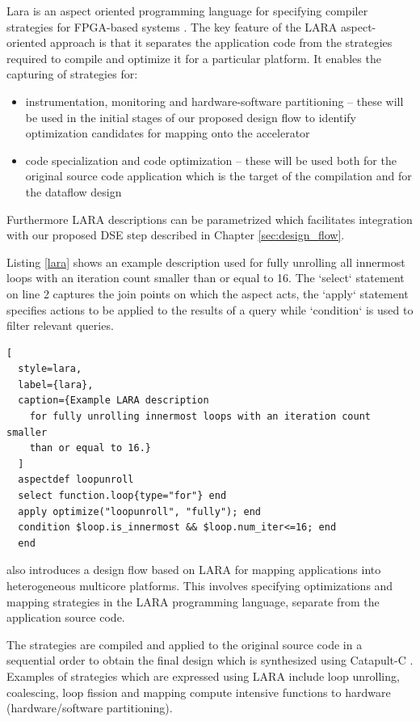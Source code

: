 Lara is an aspect oriented programming language for specifying
compiler strategies for FPGA-based systems
\cite{Cardoso:Teixeira:Alves:Nobre:Diniz:Cutinho:Luk:2012}. The key
feature of the LARA aspect-oriented approach is that it separates the
application code from the strategies required to compile and optimize
it for a particular platform. It enables the capturing of strategies
for:

\begin{itemize}
\item instrumentation, monitoring and hardware-software partitioning --
  these will be used in the initial stages of our proposed design flow
  to identify optimization candidates for mapping onto the accelerator

\item code specialization and code optimization -- these will be
  used both for the original source code application which is the
  target of the compilation and for the dataflow design
\end{itemize}

Furthermore LARA descriptions can be parametrized which facilitates
integration with our proposed DSE step described in Chapter
\ref{sec:design_flow}.

Listing \ref{lara} shows an example description used for fully
unrolling all innermost loops with an iteration count smaller than or
equal to 16. The `select` statement on line 2 captures the join points
on which the aspect acts, the `apply` statement specifies actions to
be applied to the results of a query while `condition` is used to
filter relevant queries.

\begin{lstlisting}[
  style=lara,
  label={lara},
  caption={Example LARA description
    for fully unrolling innermost loops with an iteration count smaller
    than or equal to 16.}
  ]
  aspectdef loopunroll
  select function.loop{type="for"} end
  apply optimize("loopunroll", "fully"); end
  condition $loop.is_innermost && $loop.num_iter<=16; end
  end
\end{lstlisting}

\cite{Cardoso:Carvalho:Teixeira:Diniz:Goncalves:Petrov:2012} also
introduces a design flow based on LARA for mapping applications into
heterogeneous multicore platforms. This involves specifying
optimizations and mapping strategies in the LARA programming language,
separate from the application source code.

The strategies are compiled and applied to the original source code in
a sequential order to obtain the final design which is synthesized
using Catapult-C \cite{CatapultC}. Examples of strategies which are
expressed using LARA include loop unrolling, coalescing, loop fission
and mapping compute intensive functions to hardware (hardware/software
partitioning).

